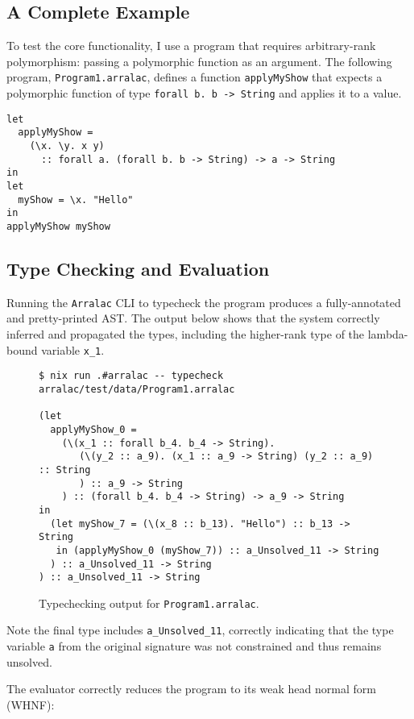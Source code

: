 \subsection{A Complete Example}
To test the core functionality, I use a program that requires arbitrary-rank polymorphism: passing a polymorphic function as an argument. The following program, \texttt{Program1.arralac}, defines a function \texttt{applyMyShow} that expects a polymorphic function of type \texttt{forall b. b -> String} and applies it to a value.

\begin{verbatim}
let
  applyMyShow =
    (\x. \y. x y)
      :: forall a. (forall b. b -> String) -> a -> String
in
let
  myShow = \x. "Hello"
in
applyMyShow myShow
\end{verbatim}

\subsection{Type Checking and Evaluation}
Running the \texttt{Arralac} CLI to typecheck the program produces a fully-annotated and pretty-printed AST. The output below shows that the system correctly inferred and propagated the types, including the higher-rank type of the lambda-bound variable \texttt{x\_1}.

\begin{figure}[h]
    \centering
    \begin{verbatim}
$ nix run .#arralac -- typecheck arralac/test/data/Program1.arralac

(let
  applyMyShow_0 = 
    (\(x_1 :: forall b_4. b_4 -> String).
       (\(y_2 :: a_9). (x_1 :: a_9 -> String) (y_2 :: a_9) :: String
       ) :: a_9 -> String
    ) :: (forall b_4. b_4 -> String) -> a_9 -> String
in
  (let myShow_7 = (\(x_8 :: b_13). "Hello") :: b_13 -> String
   in (applyMyShow_0 (myShow_7)) :: a_Unsolved_11 -> String
  ) :: a_Unsolved_11 -> String
) :: a_Unsolved_11 -> String
\end{verbatim}
    \caption{Typechecking output for \texttt{Program1.arralac}.}
    \label{fig:typecheck-output}
\end{figure}

Note the final type includes \texttt{a\_Unsolved\_11}, correctly indicating that the type variable \texttt{a} from the original signature was not constrained and thus remains unsolved.

The evaluator correctly reduces the program to its weak head normal form (WHNF):

